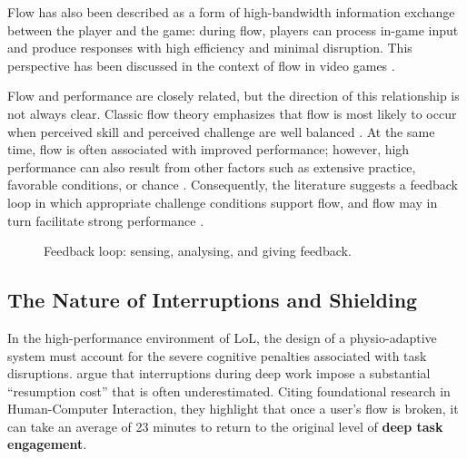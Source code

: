 Flow has also been described as a form of high-bandwidth information exchange between the player and the game: during flow, players can process in-game input and produce responses with high efficiency and minimal disruption. This perspective has been discussed in the context of flow in video games \autocite{cowley2008understanding}.

Flow and performance are closely related, but the direction of this relationship is not always clear. Classic flow theory emphasizes that flow is most likely to occur when perceived skill and perceived challenge are well balanced \autocite{inbook,nah2014flow}. At the same time, flow is often associated with improved performance; however, high performance can also result from other factors such as extensive practice, favorable conditions, or chance \autocite{harris2023systematic}. Consequently, the literature suggests a feedback loop in which appropriate challenge conditions support flow, and flow may in turn facilitate strong performance \autocite{nah2014flow,harris2023systematic}.

\begin{figure}[htbp]
    \centering
    \caption{Feedback loop: sensing, analysing, and giving feedback.}
    \label{fig:flow_feedback_loop}
\end{figure}

\subsection{The Nature of Interruptions and Shielding}
In the high-performance environment of LoL, the design of a physio-adaptive system must account for the severe cognitive penalties associated with task disruptions. \textcite{ubt_eref88160} argue that interruptions during deep work impose a substantial \enquote{resumption cost} that is often underestimated. Citing foundational research in Human-Computer Interaction, they highlight that once a user's flow is broken, it can take an average of 23 minutes to return to the original level of \textbf{deep task engagement}. 

